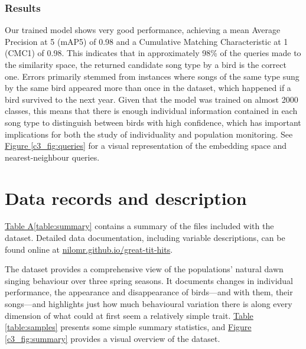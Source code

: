 \subsubsection{Results}
Our trained model shows very good performance, achieving a mean Average Precision at 5 (mAP\@5) of 0.98 and a Cumulative Matching Characteristic at 1 (CMC\@1) of 0.98. This indicates that in approximately 98\% of the queries made to the similarity space, the returned candidate song type by a bird is the correct one. Errors primarily stemmed from instances where songs of the same type sung by the same bird appeared more than once in the dataset, which happened if a bird survived to the next year. Given that the model was trained on almost 2000 classes, this means that there is enough individual information contained in each song type to distinguish between birds with high confidence, which has important implications for both the study of individuality and population monitoring. See \hyperref[c3_fig:queries]{Figure \ref*{c3_fig:queries}} for a visual representation of the embedding space and nearest-neighbour queries.

\section{Data records and description}

\hyperref[table:summary]{Table A\ref*{table:summary}} contains a summary of the files included with the dataset. Detailed data documentation, including variable descriptions, can be found online at \href{https://nilomr.github.io/great-tit-hits/}{nilomr.github.io/great-tit-hits}.

The dataset provides a comprehensive view of the populations' natural dawn singing behaviour over three spring seasons. It documents changes in individual performance, the appearance and disappearance of birds---and with them, their songs---and highlights just how much behavioural variation there is along every dimension of what could at first seem a relatively simple trait. \hyperref[table:samples]{Table \ref*{table:samples}} presents some simple summary statistics, and \hyperref[c3_fig:summary]{Figure \ref*{c3_fig:summary}} provides a visual overview of the dataset.

